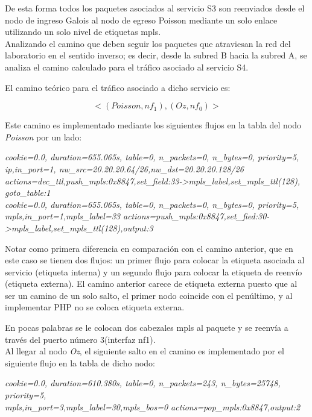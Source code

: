 De esta forma todos los paquetes asociados al servicio S3 son reenviados desde el nodo de ingreso Galois al nodo de egreso Poisson mediante un solo enlace utilizando un solo nivel de etiquetas mpls.\\

Analizando el camino que deben seguir los paquetes que atraviesan la red del laboratorio en el sentido inverso; es decir, desde la subred B hacia la subred A, se analiza el camino calculado para el tr\'afico asociado al servicio S4. 

El camino te\'orico para el tr\'afico asociado a dicho servicio es:

$$<(Poisson, nf_1), (Oz, nf_0)>$$ 

Este camino es implementado mediante los siguientes flujos en la tabla del nodo \textit{Poisson} por un lado:

\begin{center}
\textit{cookie=0.0, duration=655.065s, table=0, n\_packets=0, n\_bytes=0, priority=5, \\
ip,in\_port=1, nw\_src=20.20.20.64/26,nw\_dst=20.20.20.128/26 \\
actions=dec\_ttl,push\_mpls:0x8847,set\_field:33->mpls\_label,set\_mpls\_ttl(128), goto\_table:1 \\
cookie=0.0, duration=655.065s, table=0, n\_packets=0, n\_bytes=0, priority=5, \\
mpls,in\_port=1,mpls\_label=33 actions=push\_mpls:0x8847,set\_fied:30->mpls\_label,set\_mpls\_ttl(128),output:3
}
\end{center}

Notar como primera diferencia en comparación con el camino anterior, que en este caso se tienen dos flujos: un primer flujo para colocar la etiqueta asociada al servicio (etiqueta interna) y un segundo flujo para colocar la etiqueta de reenvío (etiqueta externa). El camino anterior carece de etiqueta externa puesto que al ser un camino de un solo salto, el primer nodo coincide con el pen\'ultimo, y al implementar PHP no se coloca etiqueta externa. 

En pocas palabras se le colocan dos cabezales mpls al paquete y se reenvía a trav\'es del puerto n\'umero 3(interfaz nf1).\\

Al llegar al nodo \textit{Oz}, el siguiente salto en el camino es implementado por el siguiente flujo en la tabla de dicho nodo:

\begin{center}
\textit{cookie=0.0, duration=610.380s, table=0, n\_packets=243, n\_bytes=25748, priority=5, \\
mpls,in\_port=3,mpls\_label=30,mpls\_bos=0 actions=pop\_mpls:0x8847,output:2 }
\end{center}


